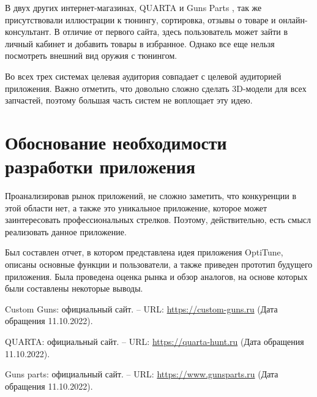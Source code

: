 \documentclass[14pt]{extreport}
\begin{document}
В двух других интернет-магазинах, QUARTA \cite{bib2} и Guns Parts \cite{bib3}, так же присутствовали иллюстрации к тюнингу, сортировка, отзывы о товаре и онлайн-консультант. В отличие от первого сайта, здесь пользователь может зайти в личный кабинет и добавить товары в избранное. Однако все еще нельзя посмотреть внешний вид оружия с тюнингом. 

Во всех трех системах целевая аудитория совпадает с целевой аудиторией приложения. Важно отметить, что довольно сложно сделать 3D-модели для всех запчастей, поэтому большая часть систем не воплощает эту идею. 


\newpage
\section{Обоснование необходимости разработки приложения}

Проанализировав рынок приложений, не сложно заметить, что конкуренции в этой области нет, а также это уникальное приложение, которое может заинтересовать профессиональных стрелков. Поэтому, действительно, есть смысл реализовать данное приложение.


\conclusions

Был составлен отчет, в котором представлена идея приложения OptiTune, описаны основные функции и пользователи, а также приведен прототип будущего приложения. Была проведена оценка рынка и обзор аналогов, на основе которых были составлены некоторые выводы.



\newpage
\begin{thebibliography}{99}

 Custom Guns: официальный сайт. – URL: \url{https://custom-guns.ru} (Дата обращения 11.10.2022).

 QUARTA: официальный сайт. – URL: \url{https://quarta-hunt.ru} (Дата обращения 11.10.2022).

 Guns parts: официальный сайт. – URL: \url{https://www.gunsparts.ru} (Дата обращения 11.10.2022).



\end{thebibliography}
\end{document}
